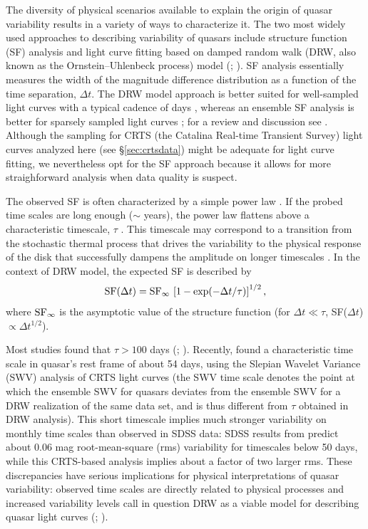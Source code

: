 \documentclass[fleqn,usenatbib]{mnras}  %
\begin{document}
The diversity of  physical scenarios available to explain the origin of quasar variability results in a variety of ways to characterize it. The two most widely used approaches to describing variability of quasars include structure function (SF) analysis and light curve
fitting based on damped random walk (DRW, also known as the Ornstein--Uhlenbeck process) model (\citealt{kelly2007}; \citealt{macleod2011}). SF analysis essentially measures the 
width of the magnitude difference distribution as a function of the time separation, $\Delta t$. 
The DRW model approach is better suited for well-sampled light curves with a typical cadence of days \citep{zu2013, kozlowski2016}, whereas an ensemble SF analysis is better for sparsely sampled light curves \citep{hawkins2002, berk2004,  devries2005}; for a review and discussion see \cite{kozlowski2016}. Although the sampling for CRTS (the Catalina Real-time Transient Survey) light curves 
analyzed here (see \S\ref{sec:crtsdata}) might be adequate for light curve fitting, we nevertheless opt for 
the SF approach because it allows for more straighforward analysis when data quality is suspect. 

The observed SF is often characterized by a simple power law \citep{schmidt2010}. If the probed time scales are long enough 
($\sim$ years), the power law flattens above a characteristic timescale, $\tau$ \citep{2004Ivezic, kelly2007, macleod2010}.
This timescale may correspond to a transition from the stochastic thermal process that drives the variability to the physical 
response of the disk that successfully  dampens the amplitude on longer timescales \citep{peterson2001, kelly2007, kelly2009, 
kelly2011, lawrence2016a}. In the context of DRW model, the expected SF is described by 
\begin{equation}
\label{eq:DRWSF}
        {\rm SF}(\Delta t) = {\rm SF}_\infty \, \left[1 - \exp(-\Delta t / \tau) \right]^{1/2},
\end{equation}
where ${\rm SF}_\infty$ is the asymptotic value of the structure function (for $\Delta t \ll \tau$, SF($\Delta t$) $\propto \Delta t^{1/2}$). 

Most studies found that $\tau > 100$ days (\citealt{macleod2010};  \citealt{kozlowski2016}). Recently, \cite{graham2014} 
found a characteristic time scale in quasar's rest frame of about 54 days, using the Slepian Wavelet Variance (SWV) analysis
of CRTS light curves (the SWV time scale denotes the point at which the ensemble SWV for quasars deviates from
the ensemble SWV for a DRW  realization of the same data set, and is thus different from $\tau$ obtained in DRW analysis). 
This short timescale implies much stronger variability on monthly time scales than observed in SDSS 
data: SDSS results from \cite{macleod2010} predict about 0.06 mag root-mean-square (rms) variability for timescales below 
50 days, while this CRTS-based analysis implies about a factor of two larger rms. These discrepancies have serious
implications for physical interpretations of quasar variability: observed time scales are directly related to physical processes
and increased variability levels call in question DRW as a viable model for describing quasar light curves 
(\citealt{macleod2010};  \citealt{kozlowski2016}). 
\end{document}
